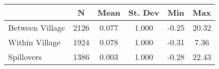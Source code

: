 \begin{tabular}{l*{5}{c}}\hline&\multicolumn{1}{c}{N}&\multicolumn{1}{c}{Mean}&\multicolumn{1}{c}{St. Dev}&\multicolumn{1}{c}{Min}&\multicolumn{1}{c}{Max}\\ \hline 
Between Village & 2126 & 0.077 & 1.000 & -0.25 & 20.32 \\
Within Village & 1924 & 0.078 & 1.000 & -0.31 & 7.36 \\
Spillovers & 1386 & 0.003 & 1.000 & -0.28 & 22.43 \\
\hline \end{tabular}

